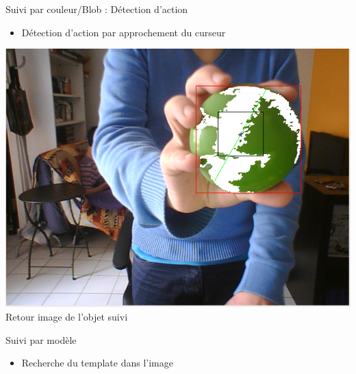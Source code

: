 \documentclass{beamer}
\begin{document}
            \begin{frame}{Suivi par couleur/Blob : Détection d'action}
                  \begin{itemize}
                        \item{Détection d'action par approchement du curseur}
                  \end{itemize}
                  \begin{center}
                        \includegraphics[scale=0.25]{Capture3.png}\\
                        Retour image de l'objet suivi
                  \end{center}
            \end{frame}
            \begin{frame}{Suivi par modèle}
                  \begin{itemize}
                        \item{Recherche du template dans l'image}
                  \end{itemize}
            \end{frame}
            
\end{document}
